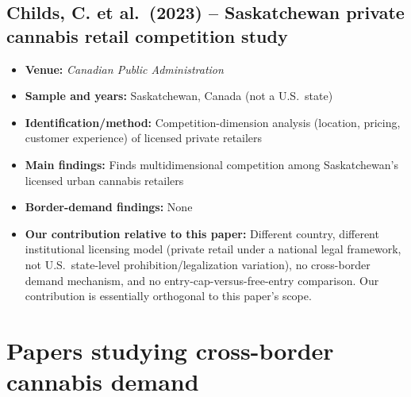 \documentclass[11pt]{article}
\begin{document}
\subsection{Childs, C. et al.\ (2023) -- Saskatchewan private cannabis retail competition study}
\begin{itemize}
\item \textbf{Venue:} \emph{Canadian Public Administration}
\item \textbf{Sample and years:} Saskatchewan, Canada (not a U.S.\ state)
\item \textbf{Identification/method:} Competition-dimension analysis (location, pricing, customer experience)
of licensed private retailers
\item \textbf{Main findings:} Finds multidimensional competition among Saskatchewan's licensed urban cannabis
retailers
\item \textbf{Border-demand findings:} None
\item \textbf{Our contribution relative to this paper:} Different country, different institutional licensing
model (private retail under a national legal framework, not U.S.\ state-level prohibition/legalization
variation), no cross-border demand mechanism, and no entry-cap-versus-free-entry comparison. Our contribution
is essentially orthogonal to this paper's scope.
\end{itemize}

\section{Papers studying cross-border cannabis demand}
\end{document}
